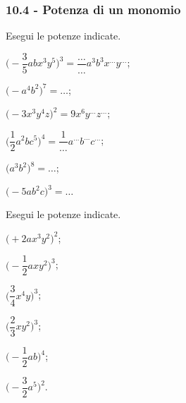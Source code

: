 \subsubsection*{10.4 - Potenza di un monomio}
\begin{esercizio}[\Ast]
 \label{ese:10.16} %
 Esegui le potenze indicate.
\begin{multicols}{2}
\begin{enumeratea}
\spazielenx
 \item $\bigg(-{\dfrac{3}{5}}abx^{3}y^{5}\bigg)^{3}=\dfrac{\ldots }{\ldots}a^{3}b^{3}x^{\ldots }y^{\ldots}$;
 \item $\big(-a^{4}b^{2}\big)^{7}=\ldots$;
 \item $\bigg(-3x^{3}y^{4}z\bigg)^{2}=9x^{6}y^{\ldots }z^{\ldots }$;
 \item $\bigg(\dfrac{1}{2}a^{2}bc^{5}\bigg)^{4}=\dfrac{1}{\ldots}a^{\ldots}b^{\ldots}c^{\ldots}$;
 \item $\big(a^{3}b^{2}\big)^{8}=\ldots$;
 \item $\big(-5ab^{2}c\big)^{3}=\ldots$
\end{enumeratea}
\end{multicols}
\end{esercizio}

\begin{esercizio}[\Ast]
 \label{ese:10.17} %
 Esegui le potenze indicate.
\begin{multicols}{3}
\begin{enumeratea}
\spazielenx
 \item $\big(+2ax^{3}y^{2}\big)^{2}$;
 \item $\bigg(-{\dfrac{1}{2}}axy^{2}\bigg)^{3}$;
 \item $\bigg(\dfrac{3}{4}x^{4}y\bigg)^{3}$;
 \item $\bigg(\dfrac{2}{3}xy^{2}\bigg)^{3}$;
 \item $\bigg(-{\dfrac{1}{2}}ab\bigg)^{4}$;
 \item $\bigg(-{\dfrac{3}{2}}a^{5}\bigg)^{2}$.
\end{enumeratea}
\end{multicols}
\end{esercizio}

